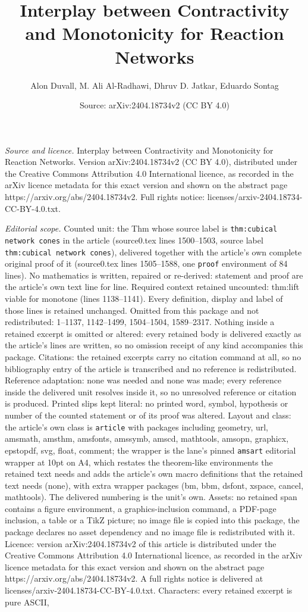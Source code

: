 \documentclass[10pt,a4paper]{amsart}
\title[Interplay between Contractivity and Monotonicity for Reactio]{Interplay between Contractivity and Monotonicity for Reaction Networks}
\author{Alon Duvall, M. Ali Al-Radhawi, Dhruv D. Jatkar, Eduardo Sontag}
\date{Source: arXiv:2404.18734v2 (CC BY 4.0)}
\begin{document}
\maketitle

\noindent\emph{Source and licence.} Interplay between Contractivity and Monotonicity for Reaction Networks. Version arXiv:2404.18734v2 (CC BY 4.0), distributed under the Creative Commons Attribution 4.0 International licence, as recorded in the arXiv licence metadata for this exact version and shown on the abstract page https://arxiv.org/abs/2404.18734v2. Full rights notice: licenses/arxiv-2404.18734-CC-BY-4.0.txt.\par\smallskip

\noindent\textit{Editorial scope.} Counted unit: the Thm whose source label is \texttt{thm:cubical network cones} in the article (source0.tex lines 1500--1503, source label \texttt{thm:cubical network cones}), delivered together with the article's own complete original proof of it (source0.tex lines 1505--1588, one \texttt{proof} environment of 84 lines). No mathematics is written, repaired or re-derived: statement and proof are the article's own text line for line. Required context retained uncounted: thm:lift viable for monotone (lines 1138--1141). Every definition, display and label of those lines is retained unchanged. Omitted from this package and not redistributed: 1--1137, 1142--1499, 1504--1504, 1589--2317. Nothing inside a retained excerpt is omitted or altered: every retained body is delivered exactly as the article's lines are written, so no omission receipt of any kind accompanies this package. Citations: the retained excerpts carry no citation command at all, so no bibliography entry of the article is transcribed and no reference is redistributed. Reference adaptation: none was needed and none was made; every reference inside the delivered unit resolves inside it, so no unresolved reference or citation is produced. Printed slips kept literal: no printed word, symbol, hypothesis or number of the counted statement or of its proof was altered. Layout and class: the article's own class is \texttt{article} with packages including geometry, url, amsmath, amsthm, amsfonts, amssymb, amscd, mathtools, amsopn, graphicx, epstopdf, svg, float, comment; the wrapper is the lane's pinned \texttt{amsart} editorial wrapper at 10pt on A4, which restates the theorem-like environments the retained text needs and adds the article's own macro definitions that the retained text needs (none), with extra wrapper packages (bm, bbm, dsfont, xspace, cancel, mathtools). The delivered numbering is the unit's own. Assets: no retained span contains a figure environment, a graphics-inclusion command, a PDF-page inclusion, a table or a TikZ picture; no image file is copied into this package, the package declares no asset dependency and no image file is redistributed with it. Licence: version arXiv:2404.18734v2 of this article is distributed under the Creative Commons Attribution 4.0 International licence, as recorded in the arXiv licence metadata for this exact version and shown on the abstract page https://arxiv.org/abs/2404.18734v2. A full rights notice is delivered at licenses/arxiv-2404.18734-CC-BY-4.0.txt. Characters: every retained excerpt is pure ASCII, 
\end{document}
